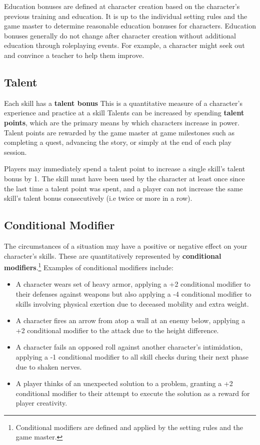 \documentclass[11pt]{article}
\begin{document}
Education bonuses are defined at character creation based on the character's previous training and education.
It is up to the individual setting rules and the game master to determine reasonable education bonuses for characters.
Education bonuses generally do not change after character creation without additional education through roleplaying events.
For example, a character might seek out and convince a teacher to help them improve.

\subsection{Talent}
Each skill has a \textbf{talent bonus}
This is a quantitative measure of a character's experience and practice at a skill
Talents can be increased by spending \textbf{talent points}, which are the primary means by which characters increase in power.
Talent points are rewarded by the game master at game milestones such as completing a quest, advancing the story, or simply at the end of each play session.

Players may immediately spend a talent point to increase a single skill's talent bonus by 1.
The skill must have been used by the character at least once since the last time a talent point was spent, and a player can not increase the same skill's talent bonus consecutively (i.e twice or more in a row).

\subsection{Conditional Modifier}
The circumstances of a situation may have a positive or negative effect on your character's skills.
These are quantitatively represented by \textbf{conditional modifiers}.\footnote{Conditional modifiers are defined and applied by the setting rules and the game master.}
Examples of conditional modifiers include:

\begin{itemize}
	\item A character wears set of heavy armor, applying a +2 conditional modifier to their defenses against weapons but also applying a -4 conditional modifier to skills involving physical exertion due to deceased mobility and extra weight.
	\item A character fires an arrow from atop a wall at an enemy below, applying a +2 conditional modifier to the attack due to the height difference.
	\item A character fails an opposed roll against another character's intimidation, applying a -1 conditional modifier to all skill checks during their next phase due to shaken nerves.
	\item A player thinks of an unexpected solution to a problem, granting a +2 conditional modifier to their attempt to execute the solution as a reward for player creativity.
\end{itemize}
\end{document}
